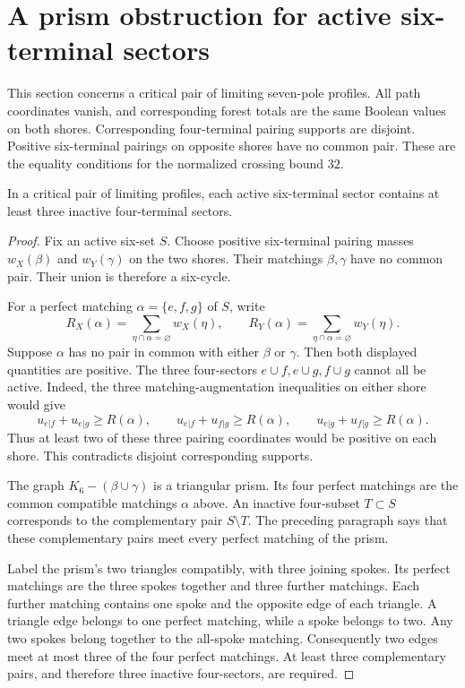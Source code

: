 \section{A prism obstruction for active six-terminal sectors}
\label{sec:four-seven-prism-obstruction}

This section concerns a critical pair of limiting seven-pole profiles.
All path coordinates vanish, and corresponding forest totals are the same Boolean values on both shores.
Corresponding four-terminal pairing supports are disjoint.
Positive six-terminal pairings on opposite shores have no common pair.
These are the equality conditions for the normalized crossing bound $32$.

\begin{lemma}\label{lem:four-seven-active-six-three-missing}
In a critical pair of limiting profiles, each active six-terminal sector contains at least three inactive four-terminal sectors.
\end{lemma}

\begin{proof}
Fix an active six-set $S$.
Choose positive six-terminal pairing masses $w_X(\beta)$ and $w_Y(\gamma)$ on the two shores.
Their matchings $\beta,\gamma$ have no common pair.
Their union is therefore a six-cycle.

For a perfect matching $\alpha=\{e,f,g\}$ of $S$, write
\[
 R_X(\alpha)=\sum_{\eta\cap\alpha=\varnothing}w_X(\eta),
 \qquad
 R_Y(\alpha)=\sum_{\eta\cap\alpha=\varnothing}w_Y(\eta).
\]
Suppose $\alpha$ has no pair in common with either $\beta$ or $\gamma$.
Then both displayed quantities are positive.
The three four-sectors $e\cup f,e\cup g,f\cup g$ cannot all be active.
Indeed, the three matching-augmentation inequalities on either shore would give
\[
 u_{e|f}+u_{e|g}\ge R(\alpha),\qquad
 u_{e|f}+u_{f|g}\ge R(\alpha),\qquad
 u_{e|g}+u_{f|g}\ge R(\alpha).
\]
Thus at least two of these three pairing coordinates would be positive on each shore.
This contradicts disjoint corresponding supports.

The graph $K_6-(\beta\cup\gamma)$ is a triangular prism.
Its four perfect matchings are the common compatible matchings $\alpha$ above.
An inactive four-subset $T\subset S$ corresponds to the complementary pair $S\setminus T$.
The preceding paragraph says that these complementary pairs meet every perfect matching of the prism.

Label the prism's two triangles compatibly, with three joining spokes.
Its perfect matchings are the three spokes together and three further matchings.
Each further matching contains one spoke and the opposite edge of each triangle.
A triangle edge belongs to one perfect matching, while a spoke belongs to two.
Any two spokes belong together to the all-spoke matching.
Consequently two edges meet at most three of the four perfect matchings.
At least three complementary pairs, and therefore three inactive four-sectors, are required.
\end{proof}

